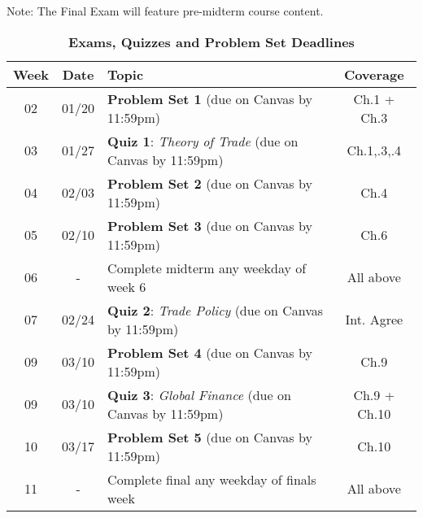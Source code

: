 \documentclass[10pt]{article}
\newcommand{\ra}[1]{\renewcommand{\arraystretch}{#1}}
\begin{document}
Note: The Final Exam will feature pre-midterm course content.

\newpage

\begin{table}[h!]
	\caption*{\large\textbf{Exams, Quizzes and Problem Set Deadlines}}
	\centering
	\ra{1.5}
	\begin{tabular}{@{\extracolsep{0.5cm}} c c l c @{}}
		\toprule
		\textbf{Week} & \textbf{Date} & \textbf{Topic} & \textbf{Coverage}  \\ \toprule 
		02 & 01/20 & \textbf{Problem Set 1} (due on Canvas by 11:59pm) & Ch.1 + Ch.3  \\
		03 & 01/27 & \textbf{Quiz 1}: \textit{Theory of Trade} (due on Canvas by 11:59pm) & Ch.1,.3,.4  \\ 
		04 & 02/03 & \textbf{Problem Set 2} (due on Canvas by 11:59pm) & Ch.4 \\
		05 & 02/10 & \textbf{Problem Set 3} (due on Canvas by 11:59pm) & Ch.6 \\ 
		06 & - & Complete midterm any weekday of week 6 & All above\\
		07 & 02/24 & \textbf{Quiz 2}: \textit{Trade Policy} (due on Canvas by 11:59pm) & Int. Agree \\ 
		09 & 03/10 & \textbf{Problem Set 4} (due on Canvas by 11:59pm) &  Ch.9 \\
		09 & 03/10 & \textbf{Quiz 3}: \textit{Global Finance} (due on Canvas by 11:59pm)&  Ch.9 + Ch.10 \\ 
		10 & 03/17 & \textbf{Problem Set 5} (due on Canvas by 11:59pm)& Ch.10 \\
		11 & - & Complete final any weekday of finals week & All above \\  \bottomrule
	\end{tabular}
\end{table}
\end{document}
